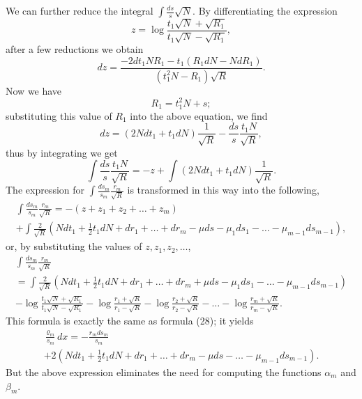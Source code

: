 \documentclass[oneside, 12 pt, leqno]{memoir}
\begin{document}
We can further reduce the integral \(\int \frac{ds}{s} \sqrt{N}\). By differentiating the expression
\[z=\log \frac{t_1 \sqrt{N}+\sqrt{R_1}}{t_1 \sqrt{N}-\sqrt{R_1}},\]
after a few reductions we obtain
\[d z=\frac{-2 d t_1 N R_1-t_1\left(R_1 d N-N d R_1\right)}{\left(t_1^2 N-R_1\right) \sqrt{R}}.\]
Now we have
\[R_1=t_1^2 N+s;\]
substituting this value of \(R_1\) into the above equation, we find
\[d z=\left(2 N d t_1+t_1 d N\right) \frac{1}{\sqrt{R}}-\frac{d s}{s} \frac{t_1 N}{\sqrt{R}},\]
thus by integrating we get
\[\int \frac{d s}{s} \frac{t_1 N}{\sqrt{R}}=-z+\int\left(2 N d t_1+t_1 d N\right) \frac{1}{\sqrt{R}}.\]
The expression for \(\int \frac{d s_m}{s_m} \frac{r_m}{\sqrt{R}}\) is transformed in this way into the following,
\[\begin{gathered}
\int \frac{d s_{m}}{s_m} \frac{r_m}{\sqrt{R}}=-\left(z+z_1+z_2+\dots+z_m\right) \\
+\int \frac{2}{\sqrt{R}}\left(N d t_1+\frac{1}{2} t_1 d N+d r_1+\dots+d r_m-\mu d s-\mu_1 d s_1-\dots-\mu_{m-1} d s_{m-1}\right),
\end{gathered}\]
or, by substituting the values of \(z, z_1, z_2, \dots\),
\[\tag{36}
\begin{gathered}
 \int\frac{ds_m}{s_m} \frac{r_m}{\sqrt{R}} \\
 =\int \frac{2}{\sqrt{R}}\left(N d t_1+\frac{1}{2} t_1 d N+d r_1+\dots+d r_m+\mu d s-\mu_1 d s_1-\dots-\mu_{m-1} d s_{m-1}\right) \\
 -\log \frac{t_1 \sqrt{N}+\sqrt{R_1}}{t_1 \sqrt{N}-\sqrt{R_1}}-\log \frac{r_1+\sqrt{R}}{r_1-\sqrt{R}}- \log \frac{r_2+\sqrt{R}}{r_2-\sqrt{R}}-\dots-\log \frac{r_m+\sqrt{R}}{r_m-\sqrt{R}}.
\end{gathered}\]
This formula is exactly the same as formula (28); it yields
\[\tag{37}\begin{gathered}
\frac{\varrho_m}{s_m} d x=-\frac{r_m d s_m}{s_m} \\
+2\left(N d t_1+\frac{1}{2} t_1 d N+d r_1+\dots+d r_m-\mu d s-\dots-\mu_{m-1} d s_{m-1}\right).
\end{gathered}\]
But the above expression eliminates the need for computing the functions \(\alpha_m\) and \(\beta_m\).
\end{document}

